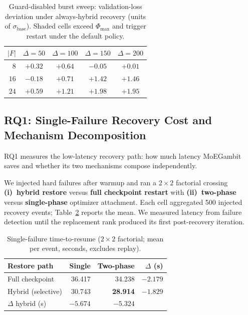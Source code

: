\documentclass[10pt,conference]{IEEEtran}
\begin{document}
\begin{table}[!t]
\caption{Guard-disabled burst sweep: validation-loss deviation under always-hybrid recovery (units of $\sigma_{\text{base}}$). Shaded cells exceed $\Phi_{\max}$ and trigger restart under the default policy.}
\label{tab:multi_fault}
\setlength{\tabcolsep}{6pt}
\renewcommand{\arraystretch}{1.1}
\begin{center}
\footnotesize
\begin{tabular}{@{}r|cccc@{}}
\toprule
$|F|$ & $\Delta\!=\!50$ & $\Delta\!=\!100$ & $\Delta\!=\!150$ & $\Delta\!=\!200$ \\
\midrule
$8$  & $+0.32$ & $+0.64$ & $-0.05$ & $+0.01$ \\
$16$ & $-0.18$ & $+0.71$ & \cellcolor{red!12}$+1.42$ & \cellcolor{red!12}$+1.46$ \\
$24$ & $+0.59$ & \cellcolor{red!12}$+1.21$ & \cellcolor{red!12}$+1.98$ & \cellcolor{red!12}$+1.95$ \\
\bottomrule
\end{tabular}
\end{center}
\end{table}

\subsection{RQ1: Single-Failure Recovery Cost and Mechanism Decomposition}
\label{sec:rq1}

RQ1 measures the low-latency recovery path: how much latency MoEGambit saves and whether its two mechanisms compose independently.

We injected hard failures after warmup and ran a $2\times 2$ factorial crossing \textbf{(i)~hybrid restore} versus \textbf{full checkpoint restart} with \textbf{(ii)~two-phase} versus \textbf{single-phase} optimizer attachment. Each cell aggregated 500 injected recovery events; Table~\ref{tab:single} reports the mean. We measured latency from failure detection until the replacement rank produced its first post-recovery iteration.

\begin{table}[!b]
\caption{Single-failure time-to-resume ($2{\times}2$ factorial; mean per event, seconds, excludes replay).}
\label{tab:single}
\setlength{\tabcolsep}{3pt}
\renewcommand{\arraystretch}{1.15}
\begin{center}
\footnotesize
\begin{tabular}{@{}l r r r@{}}
\toprule
\textbf{Restore path} & \textbf{Single} & \textbf{Two-phase} & \textbf{$\Delta$ (s)} \\
\midrule
Full checkpoint  & 36.417 & 34.238          & $-2.179$ \\
Hybrid (selective) & 30.743 & \textbf{28.914} & $-1.829$ \\
\midrule
$\Delta$ hybrid (s) & $-5.674$ & $-5.324$ & \\
\bottomrule
\end{tabular}
\end{center}
\end{table}
\end{document}
